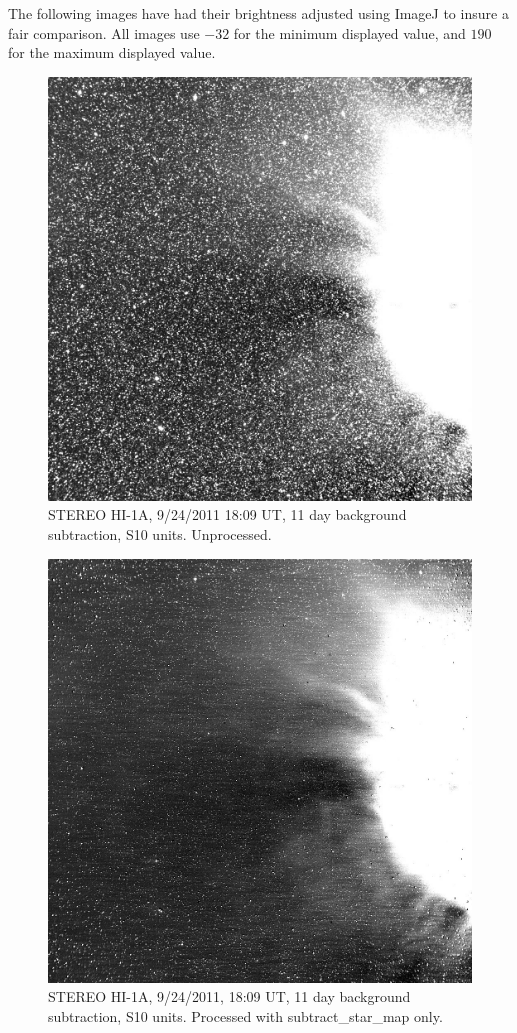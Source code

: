 The following images have had their brightness adjusted using ImageJ to insure a fair comparison. All images use $-32$ for the minimum displayed value, and $190$ for the maximum displayed value.
%
\begin{figure}
  \centering
  \includegraphics[scale=0.5]{../IMAGES/20110924_180901_24h1A_br11_WITH_STARS_S10_contrast_32_190.jpg} 
  \caption{STEREO HI-1A, 9/24/2011 18:09 UT, 11 day background subtraction, S10 units. Unprocessed.} 
  \label{fig:hi1a_with_stars_s10}
\end{figure}
%
\begin{figure}
  \centering
  \includegraphics[scale=0.5]{../IMAGES/20110924_180901_24h1A_br11_NO_STARS_S10_contrast_32_190.jpg} 
  \caption{STEREO HI-1A, 9/24/2011, 18:09 UT, 11 day background subtraction, S10 units. Processed with subtract\_star\_map only.}
  \label{fig:hi1a_subtract_star_map}
\end{figure}
